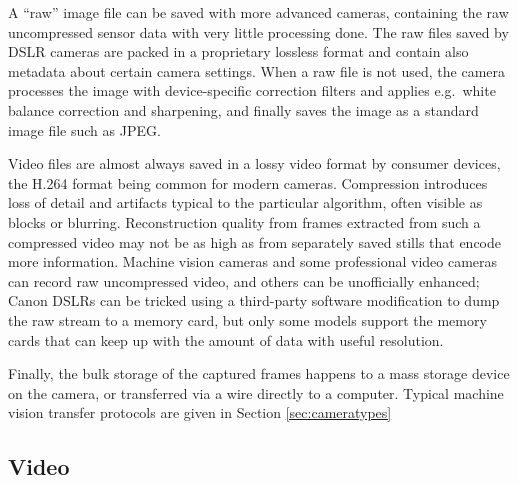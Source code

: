 
A ``raw'' image file can be saved with more advanced cameras, containing the raw uncompressed sensor data with very little processing done.
The raw files saved by DSLR cameras are packed in a proprietary lossless format and contain also metadata about certain camera settings.
When a raw file is not used, the camera processes the image with device-specific correction filters and applies e.g.~white balance correction and sharpening, and finally saves the image as a standard image file such as JPEG.
\cite{szeliski10vision}


Video files are almost always saved in a lossy video format by consumer devices, the H.264 format being common for modern cameras.
Compression introduces loss of detail and artifacts typical to the particular algorithm, often visible as blocks or blurring.
\cite{richardson2004h264}
Reconstruction quality from frames extracted from such a compressed video may not be as high as from separately saved stills that encode more information.
Machine vision cameras and some professional video cameras can record raw uncompressed video, and others can be unofficially enhanced;
Canon DSLRs can be tricked using a third-party software modification \cite{magiclantern} to dump the raw stream to a memory card, but only some models support the memory cards that can keep up with the amount of data with useful resolution.

Finally, the bulk storage of the captured frames happens to a mass storage device on the camera, or transferred via a wire directly to a computer.
\cite{hornberg2007handbook,ni2013choosing}
Typical machine vision transfer protocols are given in Section \ref{sec:cameratypes}


\subsection{Video} \label{sec:video} %

